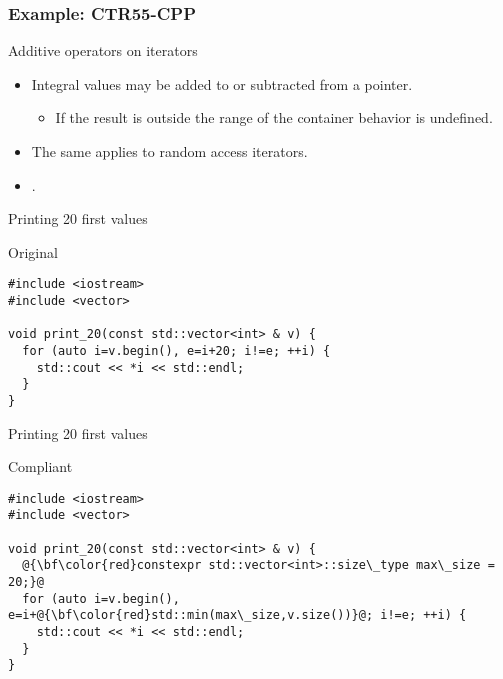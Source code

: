 \subsubsection{Example: CTR55-CPP}

\begin{frame}[t]{Additive operators on iterators}
\begin{itemize}
  \item Integral values may be added to or subtracted from a pointer.
    \begin{itemize}
      \item If the result is outside the range of the container behavior is undefined.
    \end{itemize}

  \vfill
  \item The same applies to random access iterators.

  \vfill
  \item {}.
\end{itemize}
\end{frame}

\begin{frame}[t,fragile]{Printing 20 first values}
\begin{block}{Original}
\begin{lstlisting}
#include <iostream>
#include <vector>

void print_20(const std::vector<int> & v) {
  for (auto i=v.begin(), e=i+20; i!=e; ++i) {
    std::cout << *i << std::endl;
  }
}
\end{lstlisting}
\end{block}
\end{frame}

\begin{frame}[t,fragile]{Printing 20 first values}
\begin{block}{Compliant}
\begin{lstlisting}[escapechar=@]
#include <iostream>
#include <vector>

void print_20(const std::vector<int> & v) {
  @{\bf\color{red}constexpr std::vector<int>::size\_type max\_size = 20;}@
  for (auto i=v.begin(), e=i+@{\bf\color{red}std::min(max\_size,v.size())}@; i!=e; ++i) {
    std::cout << *i << std::endl;
  }
}
\end{lstlisting}
\end{block}

\end{frame}

